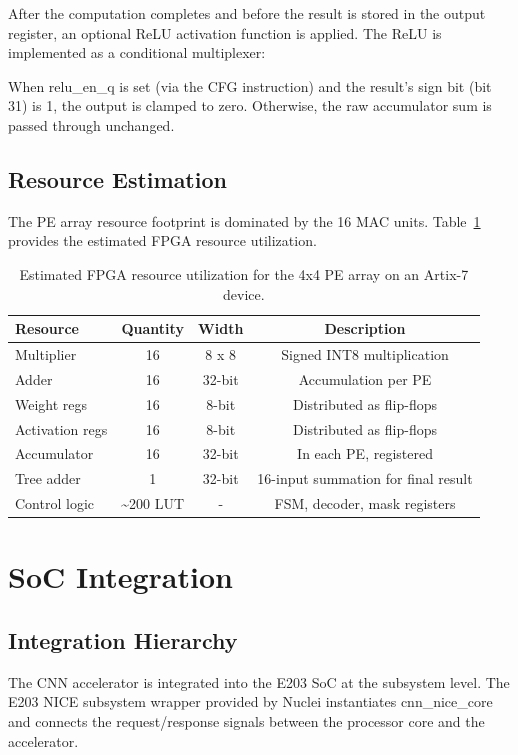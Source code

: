 After the computation completes and before the result is stored in the output register, an optional ReLU activation function is applied. The ReLU is implemented as a conditional multiplexer:

When relu\_en\_q is set (via the CFG instruction) and the result’s sign bit (bit 31) is 1, the output is clamped to zero. Otherwise, the raw accumulator sum is passed through unchanged.

\subsection{Resource Estimation}

The PE array resource footprint is dominated by the 16 MAC units. Table~\ref{tab:3_5} provides the estimated FPGA resource utilization.

\begin{table}[htbp]
\centering
\caption{Estimated FPGA resource utilization for the 4x4 PE array on an Artix-7 device.}
\label{tab:3_5}
\begin{tabular}{lccc}
\hline
Resource & Quantity & Width & Description \\ \hline\hline
Multiplier & 16 & 8 x 8 & Signed INT8 multiplication \\ \hline
Adder & 16 & 32-bit & Accumulation per PE \\ \hline
Weight regs & 16 & 8-bit & Distributed as flip-flops \\ \hline
Activation regs & 16 & 8-bit & Distributed as flip-flops \\ \hline
Accumulator & 16 & 32-bit & In each PE, registered \\ \hline
Tree adder & 1 & 32-bit & 16-input summation for final result \\ \hline
Control logic & \textasciitilde{}200 LUT & - & FSM, decoder, mask registers \\ \hline
\end{tabular}
\end{table}

\section{SoC Integration}\label{sec:3_4}

\subsection{Integration Hierarchy}

The CNN accelerator is integrated into the E203 SoC at the subsystem level. The E203 NICE subsystem wrapper provided by Nuclei instantiates cnn\_nice\_core and connects the request/response signals between the processor core and the accelerator.

